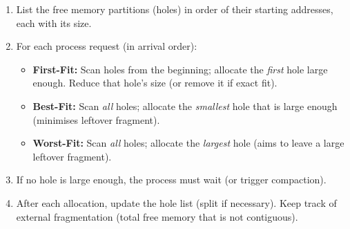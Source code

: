 \documentclass[11pt]{article}
\newcommand{\cle}[1]{{\popxbold\color{popdark}#1}}
\begin{document}
\begin{methode}
\begin{enumerate}
\item List the \cle{free memory partitions} (holes) in order of their starting addresses, each with its size.
\item For each process request (in arrival order):
\begin{itemize}
\item \textbf{First-Fit:} Scan holes from the beginning; allocate the \emph{first} hole large enough. Reduce that hole's size (or remove it if exact fit).
\item \textbf{Best-Fit:} Scan \emph{all} holes; allocate the \emph{smallest} hole that is large enough (minimises leftover fragment).
\item \textbf{Worst-Fit:} Scan \emph{all} holes; allocate the \emph{largest} hole (aims to leave a large leftover fragment).
\end{itemize}
\item If no hole is large enough, the process must wait (or trigger compaction).
\item After each allocation, update the hole list (split if necessary). Keep track of \cle{external fragmentation} (total free memory that is not contiguous).
\end{enumerate}
\end{methode}
\end{document}
